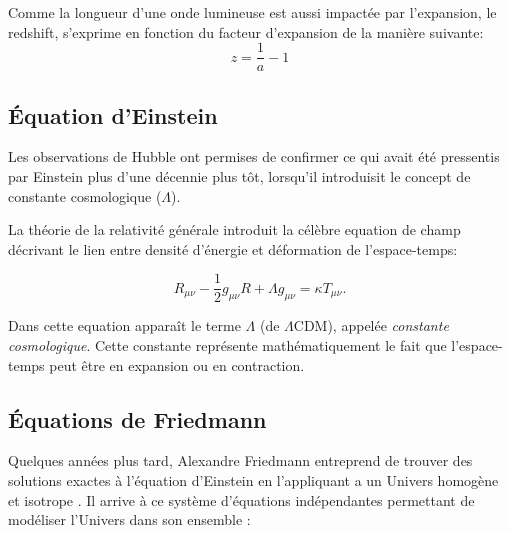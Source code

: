 Comme la longueur d'une onde lumineuse est aussi impactée par l'expansion, le redshift, s'exprime en fonction du facteur d'expansion de la manière suivante:
\begin{equation}
z= \frac{1}{a}-1
\end{equation}

\subsection{Équation d'Einstein}

Les observations de Hubble ont permises de confirmer ce qui avait été pressentis par Einstein plus d'une décennie plus tôt, lorsqu'il introduisit le concept de constante cosmologique ($\Lambda$). 

La théorie de la relativité générale \citep{1916AnP...354..769E} introduit la célèbre equation de champ décrivant le lien entre densité d'énergie et déformation de l'espace-temps:

\begin{equation}
R_{\mu\nu} - \frac{1}{2} g_{\mu\nu}R + \Lambda g_{\mu\nu}  = \kappa T_{\mu\nu}.
\label{eq:einstein}
\end{equation} 

Dans cette equation apparaît le terme $\Lambda$ (de $\Lambda$CDM), appelée \textit{constante cosmologique}.
Cette constante représente mathématiquement le fait que l'espace-temps peut être en expansion ou en contraction.

\subsection{Équations de Friedmann}
\label{sec:friedman}

Quelques années plus tard, Alexandre Friedmann entreprend de trouver des solutions exactes à l'équation d'Einstein en l'appliquant a un Univers homogène et isotrope \citep{1922ZPhy...10..377F}.
Il arrive à ce système d'équations indépendantes permettant de modéliser l'Univers dans son ensemble :

% 
%
% 
 
